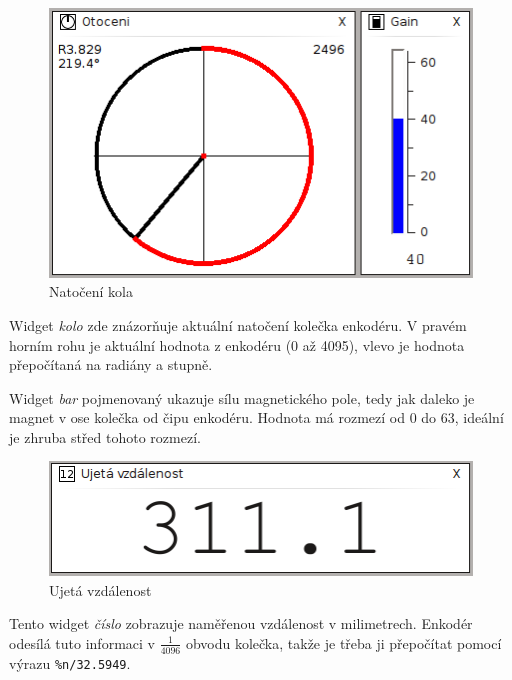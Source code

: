 \documentclass[12pt, a4paper, oneside]{article}
\newcommand{\It}{\textit}  %
\begin{document}
\textheight=592pt
\pagestyle{plain}
\newpage
\voffset=0mm
\begin{figure}[H]
\begin{center}
\includegraphics[width=\textwidth-40pt]{img/enc_circle.png}
\caption{Natočení kola}
\end{center}
\end{figure}
Widget \It{kolo} zde znázorňuje aktuální natočení kolečka enkodéru. V pravém horním rohu je aktuální hodnota z enkodéru (0 až 4095), vlevo je hodnota přepočítaná na radiány a stupně.

Widget \It{bar} pojmenovaný  ukazuje sílu magnetického pole, tedy jak daleko je magnet v ose kolečka od čipu enkodéru. Hodnota má rozmezí od 0 do 63, ideální je zhruba střed tohoto rozmezí.

\begin{figure}[H]
\begin{center}
\includegraphics[width=\textwidth-60pt]{img/enc_dist.png}
\caption{Ujetá vzdálenost}
\end{center}
\end{figure}
Tento widget \It{číslo} zobrazuje naměřenou vzdálenost v milimetrech. Enkodér odesílá tuto informaci v $\frac{1}{4096}$ obvodu kolečka, takže je třeba ji přepočítat pomocí výrazu \verb|%n/32.5949|.
\end{document}
